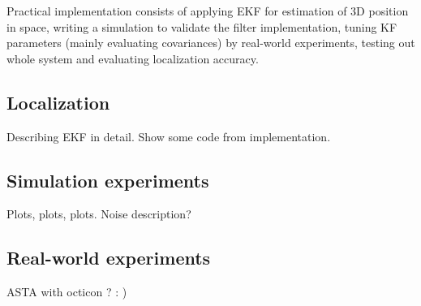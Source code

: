 Practical implementation consists of applying EKF for estimation of 3D position in space, writing a simulation to validate the filter implementation, tuning KF parameters (mainly evaluating covariances) by real-world experiments, testing out whole system and evaluating localization accuracy.

\subsection{Localization}

Describing EKF in detail. Show some code from implementation.

\subsection{Simulation experiments}

Plots, plots, plots. Noise description? 

\subsection{Real-world experiments}

ASTA with octicon ? : )
